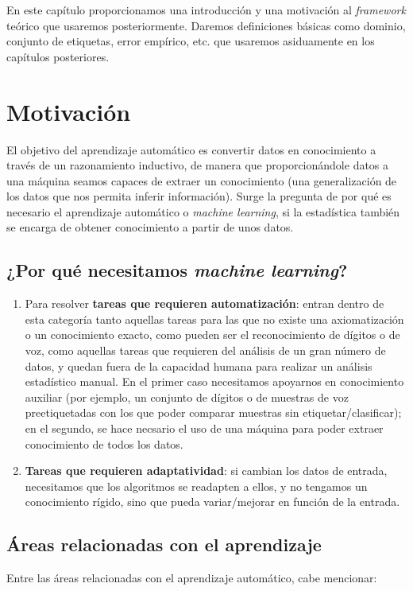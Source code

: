 En este capítulo proporcionamos una introducción y una motivación al \textit{framework} teórico que usaremos
posteriormente. Daremos definiciones básicas como dominio, conjunto de etiquetas, error empírico, etc. que
usaremos asiduamente en los capítulos posteriores.

\section{Motivación}
El objetivo del aprendizaje automático es convertir datos en conocimiento a través de un razonamiento inductivo, de manera que
proporcionándole datos a una máquina seamos capaces de extraer un conocimiento (una generalización de los datos que nos permita
inferir información). Surge la pregunta de por qué es necesario el aprendizaje automático o \textit{machine learning}, si la
estadística también se encarga de obtener conocimiento a partir de unos datos.

\subsection{¿Por qué necesitamos \textit{machine learning}?}
\begin{enumerate}[i]
 \item Para resolver \textbf{tareas que requieren automatización}: entran dentro de esta categoría tanto aquellas tareas para
 las que no existe una axiomatización o un conocimiento exacto, como pueden ser el reconocimiento de dígitos o de voz, como 
 aquellas tareas que requieren del análisis de un gran número de datos, y quedan fuera de la capacidad humana para realizar
 un análisis estadístico manual. En el primer caso necesitamos apoyarnos en conocimiento auxiliar (por ejemplo, 
 un conjunto de dígitos o de muestras de voz preetiquetadas con los que poder comparar muestras sin etiquetar/clasificar); 
 en el segundo, se hace necsario el uso de una máquina para poder extraer conocimiento de todos los datos.
 
 \item \textbf{Tareas que requieren adaptatividad}: si cambian los datos de entrada, necesitamos que los algoritmos se readapten
 a ellos, y no tengamos un conocimiento rígido, sino que pueda variar/mejorar en función de la entrada.
\end{enumerate}

\subsection{Áreas relacionadas con el aprendizaje}
Entre las áreas relacionadas con el aprendizaje automático, cabe mencionar:

